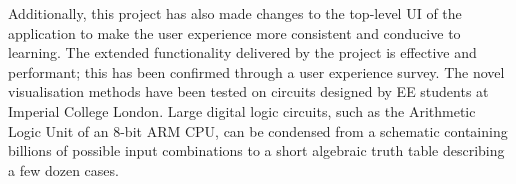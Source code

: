 Additionally, this project has also made changes to the top-level UI of the application to make the user experience more consistent and conducive to learning.
The extended functionality delivered by the project is effective and performant; this has been confirmed through a user experience survey. The novel visualisation methods have been tested on circuits designed by EE students at Imperial College London. Large digital logic circuits, such as the Arithmetic Logic Unit of an 8-bit ARM CPU, can be condensed from a schematic containing billions of possible input combinations to a short algebraic truth table describing a few dozen cases. 

\newpage

\tableofcontents

\listoftables

\listoffigures